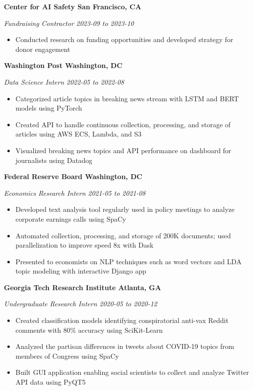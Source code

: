\documentclass{article}
\newcommand{\headingTwo}[2]{
    \vspace*{6pt}
    \textbf{#1 \hfill #2}
}
\newcommand{\headingThree}[2]{
    \vspace*{2pt}
    \textsl{#1 \hfill #2}
}
\begin{document}
\headingTwo{Center for AI Safety}{San Francisco, CA}

\headingThree{Fundraising Contractor}{2023-09 to 2023-10}
\begin{itemize}
    \item Conducted research on funding opportunities and developed strategy for donor engagement
\end{itemize}


\headingTwo{Washington Post}{Washington, DC}

\headingThree{Data Science Intern}{2022-05 to 2022-08}
\begin{itemize}
    \item Categorized article topics in breaking news stream with LSTM and BERT models using PyTorch
    \item Created API to handle continuous collection, processing, and storage of articles using AWS ECS, Lambda, and S3
    \item Visualized breaking news topics and API performance on dashboard for journalists using Datadog
\end{itemize}


\headingTwo{Federal Reserve Board}{Washington, DC}

\headingThree{Economics Research Intern}{2021-05 to 2021-08}
\begin{itemize}
    \item Developed text analysis tool regularly used in policy meetings to analyze corporate earnings calls using SpaCy
    \item Automated collection, processing, and storage of 200K documents; used parallelization to improve speed 8x with Dask
    \item Presented to economists on NLP techniques such as word vectors and LDA topic modeling with interactive Django app
\end{itemize}


\headingTwo{Georgia Tech Research Institute}{Atlanta, GA}

\headingThree{Undergraduate Research Intern}{2020-05 to 2020-12}
\begin{itemize}
    \item Created classification models identifying conspiratorial anti-vax Reddit comments with 80\% accuracy using SciKit-Learn
    \item Analyzed the partisan differences in tweets about COVID-19 topics from members of Congress using SpaCy
    \item Built GUI application enabling social scientists to collect and analyze Twitter API data using PyQT5
\end{itemize}
\end{document}
